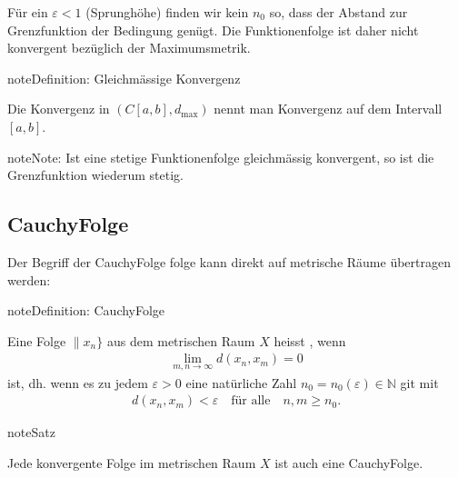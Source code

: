 \documentclass[letterpaper,10pt,english]{jupyterBook}
\begin{document}
\noindent{}

Für ein \(\varepsilon < 1\) (Sprunghöhe) finden wir kein \(n_0\) so, dass der Abstand zur Grenzfunktion der Bedingung genügt. Die Funktionenfolge ist daher nicht konvergent bezüglich der Maximumsmetrik.

\begin{sphinxadmonition}{note}{Definition: Gleichmässige Konvergenz}

Die Konvergenz in \((C[a,b],d_{\max})\) nennt man  Konvergenz auf dem Intervall \([a,b]\).
\end{sphinxadmonition}

\begin{sphinxadmonition}{note}{Note:}
Ist eine stetige Funktionenfolge gleichmässig konvergent, so ist die Grenzfunktion wiederum stetig.
\end{sphinxadmonition}


\subsection{Cauchy\sphinxhyphen{}Folge}
\label{\detokenize{Funktionalanalysis/GrundlegendeRaeume:cauchy-folge}}
Der Begriff der Cauchy\sphinxhyphen{}Folge folge kann direkt auf metrische Räume übertragen werden:

\begin{sphinxadmonition}{note}{Definition: Cauchy\sphinxhyphen{}Folge}

Eine Folge \(\|x_n\}\) aus dem metrischen Raum \(X\) heisst , wenn
\begin{equation*}
\begin{split}\lim_{m,n\to\infty} d(x_n,x_m) = 0\end{split}
\end{equation*}
ist, dh. wenn es zu jedem \(\varepsilon > 0\) eine natürliche Zahl \(n_0 = n_0(\varepsilon)\in\mathbb{N}\) git mit
\begin{equation*}
\begin{split}d(x_n,x_m) < \varepsilon\quad\text{für alle}\quad n,m \ge n_0.\end{split}
\end{equation*}\end{sphinxadmonition}

\begin{sphinxadmonition}{note}{Satz}

Jede konvergente Folge im metrischen Raum \(X\) ist auch eine Cauchy\sphinxhyphen{}Folge.
\end{sphinxadmonition}
\end{document}
